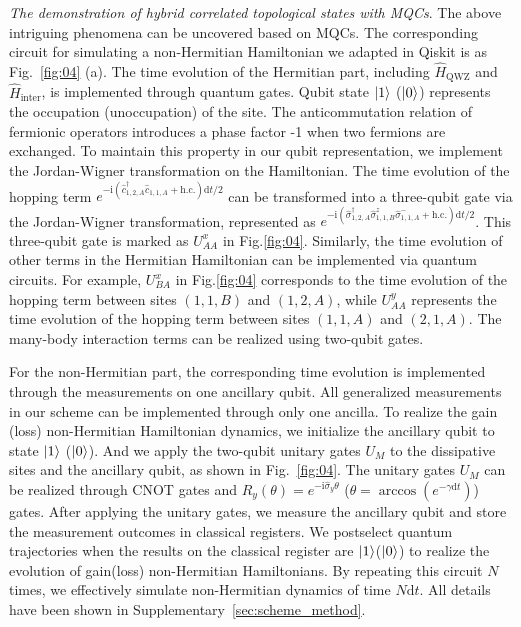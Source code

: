 \documentclass[longbibliography, aps, prx, amsmath, amssymb, amsfonts, twocolumn,superscriptaddress, footinbib]{revtex4-1}
\begin{document}
    
	\textit{The demonstration of hybrid correlated topological states with MQCs}.
	The above intriguing phenomena can be uncovered based on MQCs. The corresponding circuit for simulating a non-Hermitian Hamiltonian we adapted in Qiskit is as Fig.~\ref{fig:04} (a). The time evolution of the Hermitian part, including $\hat{H}_{\text{QWZ}}$ and $\hat{H}_{\text{inter}}$, is implemented through quantum gates. 
	Qubit state $\ket{1}$ ($\ket{0}$) represents the occupation (unoccupation) of the site. 
	The anticommutation relation of fermionic operators introduces a phase factor -1 when two fermions are exchanged. To maintain this property in our qubit representation, we implement the Jordan-Wigner transformation on the Hamiltonian.
    The time evolution of the hopping term $e^{-\mathrm{i} (\hat{c}_{1,2,A}^{\dagger} \hat{c}_{1,1,A} + \text{h.c.})\mathrm{d} t/2}$ can be transformed into a three-qubit gate via the Jordan-Wigner transformation, represented as $e^{-\mathrm{i} (\hat{\sigma}_{1,2,A}^{\dagger} \hat{\sigma}^z_{1,1,B}\hat{\sigma}_{1,1,A}^{-} + \text{h.c.})\mathrm{d} t/2}$. This three-qubit gate is marked as $U_{AA}^x$ in Fig.\ref{fig:04}. Similarly, the time evolution of other terms in the Hermitian Hamiltonian can be implemented via quantum circuits. For example, $U_{BA}^x$ in Fig.\ref{fig:04} corresponds to the time evolution of the hopping term between sites $(1,1,B)$ and $(1,2,A)$, while $U_{AA}^y$ represents the time evolution of the hopping term between sites $(1,1,A)$ and $(2,1,A)$. The many-body interaction terms can be realized using two-qubit gates.

	For the non-Hermitian part, the corresponding time evolution is implemented through the measurements on one ancillary qubit. 
	All generalized measurements in our scheme can be implemented through only one ancilla. To realize the gain (loss) non-Hermitian Hamiltonian dynamics, we initialize the ancillary qubit to state $\ket{1}$ ($\ket{0}$). And we apply the two-qubit unitary gates $U_M$ to the dissipative sites and the ancillary qubit, as shown in Fig.~\ref{fig:04}. The unitary gates $U_M$ can be realized through CNOT gates and $R_y(\theta) = e^{-\mathrm{i} \hat{\sigma}_y \theta}$ ($\theta = \arccos(e^{-\gamma \mathrm{d}t})$) gates.
	After applying the unitary gates, we measure the ancillary qubit and store the measurement outcomes in classical registers. 
	We postselect quantum trajectories when the results on the classical register are $\ket{1}$($\ket{0}$) to realize the evolution of gain(loss) non-Hermitian Hamiltonians. By repeating this circuit $N$ times, we effectively simulate non-Hermitian dynamics of time $N\mathrm{d}t$. All details have been shown in Supplementary~\ref{sec:scheme_method}.
\end{document}
